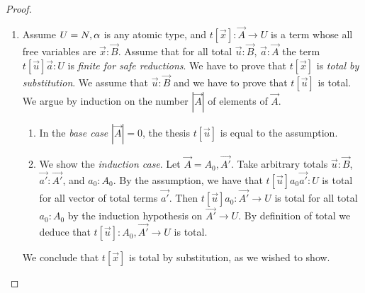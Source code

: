 \begin{proof}
\begin{enumerate}
\item  
Assume $U={N}, \alpha$ is any atomic type, and $t[\vec{x}]:\vec{A}\rightarrow U$ is a term
whose all free variables are $\vec{x}:\vec{B}$.
Assume that for all total $\vec{u}:\vec{B}$, $\vec{a}:\vec{A}$ the term 
$t[\vec{u}]\vec{a}: U$ is \emph{finite for safe reductions}. We have to prove that
$t[\vec{x}]$ is \emph{total by substitution}.
We assume that  $\vec{u}:\vec{B}$ and we have to prove that $t[\vec{u}]$ is total.
We argue by induction on the number $|\vec{A}|$ of elements of $\vec{A}$.
\begin{enumerate}
\item
  In the \emph{base case} $|\vec{A}| = 0$, the thesis $t[\vec{u}]$ is equal to the assumption.
\item
  We show the \emph{induction case}. Let $\vec{A} = A_0,\vec{A'}$.
  Take arbitrary totals $\vec{u}:\vec{B}$, $\vec{a'}:\vec{A'}$, and $a_0:A_0$. 
  By the assumption, we have that $t[\vec{u}]a_0\vec{a'}: U$ is total  for all 
  vector of total terms $\vec{a'}$. 
  Then $t[\vec{u}]a_0:\vec{A'}\rightarrow U$ is total for all total $a_0:A_0$
  by the induction hypothesis on $\vec{A'}\rightarrow U$.
  By definition of total we deduce that $t[\vec{u}] : A_0,\vec{A'}\rightarrow U$ is total.
\end{enumerate}
We conclude that $t[\vec{x}]$ is total by substitution, as we wished to show.
\end{enumerate}
\end{proof}



%

